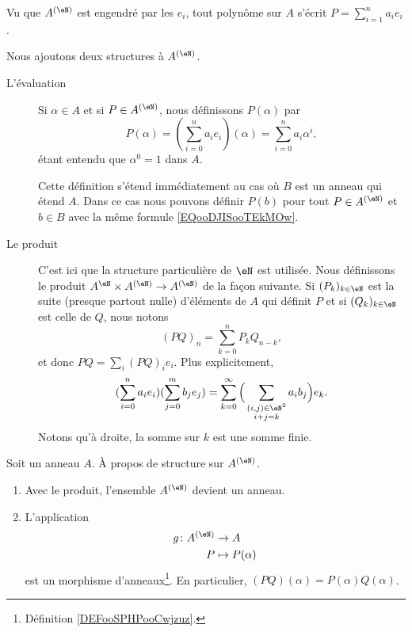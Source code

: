 Vu que \( A^{(\eN)}\) est engendré par les \( e_i\), tout polynôme sur \( A\) s'écrit \( P=\sum_{i=1}^na_ie_i\).

\begin{definition}      \label{DEFooNXKUooLrGeuh}
	Nous ajoutons deux structures à \( A^{(\eN)}\).
	\begin{description}
		\item[L'évaluation] Si \( \alpha\in A\) et si \( P\in A^{(\eN)}\), nous définissons \( P(\alpha)\) par
		      \begin{equation}        \label{EQooDJISooTEkMOw}
			      P(\alpha)=(\sum_{i=0}^{n}a_ie_i)(\alpha)=\sum_{i=0}^na_i\alpha^i,
		      \end{equation}
		      étant entendu que \( \alpha^0=1\) dans \( A\).

		      Cette définition s'étend immédiatement au cas où \( B\) est un anneau qui étend \( A\). Dans ce cas nous pouvons définir \( P(b)\) pour tout \( P\in A^{(\eN)}\) et \( b\in B\) avec la même formule \eqref{EQooDJISooTEkMOw}.
		\item[Le produit] C'est ici que la structure particulière de \( \eN\) est utilisée. Nous définissons le produit \( A^{\eN}\times A^{(\eN)}\to A^{(\eN)}\) de la façon suivante. Si \( (P_k)_{k\in \eN}\) est la suite (presque partout nulle) d'éléments de \( A\) qui définit \( P\) et si \( (Q_k)_{k\in \eN}\) est celle de \( Q\), nous notons
		      \begin{equation}    \label{EQooTNCSooKklisb}
			      (PQ)_n=\sum_{k=0}^nP_kQ_{n-k},
		      \end{equation}
		      et donc \( PQ=\sum_i(PQ)_ie_i\). Plus explicitement,
		      \begin{equation}    \label{EQooCIBUooAgpxjL}
			      (\sum_{i=0}^na_ie_i)(\sum_{j=0}^mb_je_j)=\sum_{k=0}^{\infty}\Big( \sum_{\substack{  (i,j)\in \eN^2 \\i+j=k}}a_ib_j \Big)e_k.
		      \end{equation}
		      Notons qu'à droite, la somme sur \( k\) est une somme finie.
	\end{description}
\end{definition}

\begin{proposition}     \label{PROPooGDQCooHziCPH}
	Soit un anneau \( A\). À propos de structure sur \( A^{(\eN)}\).
	\begin{enumerate}
		\item
		      Avec le produit, l'ensemble \( A^{(\eN)}\) devient un anneau.
		\item
		      L'application
		      \begin{equation}
			      \begin{aligned}
				      g\colon A^{(\eN)} & \to A             \\
				      P                 & \mapsto P(\alpha)
			      \end{aligned}
		      \end{equation}
		      est un morphisme d'anneaux\footnote{Définition \ref{DEFooSPHPooCwjzuz}.}. En particulier, \( (PQ)(\alpha)=P(\alpha)Q(\alpha)\).
	\end{enumerate}
\end{proposition}

